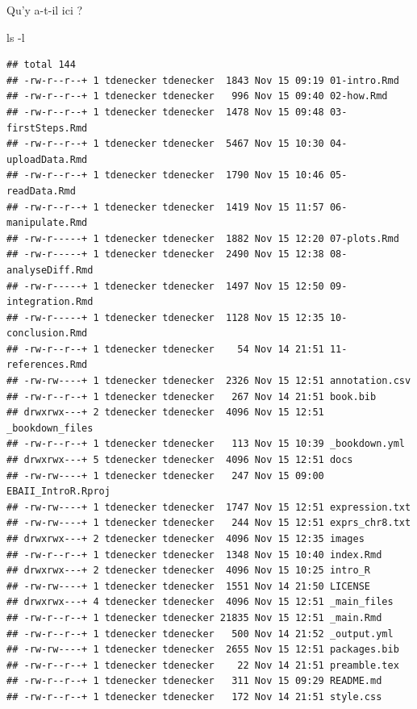 \documentclass[
]{book}
\newenvironment{Shaded}{\begin{snugshade}}{\end{snugshade}}
\newcommand{\AttributeTok}[1]{\textcolor[rgb]{0.77,0.63,0.00}{#1}}
\newcommand{\FunctionTok}[1]{\textcolor[rgb]{0.00,0.00,0.00}{#1}}
\begin{document}
Qu'y a-t-il ici ?

\begin{Shaded}
\begin{Highlighting}[]
\FunctionTok{ls} \AttributeTok{{-}l}
\end{Highlighting}
\end{Shaded}

\begin{verbatim}
## total 144
## -rw-r--r--+ 1 tdenecker tdenecker  1843 Nov 15 09:19 01-intro.Rmd
## -rw-r--r--+ 1 tdenecker tdenecker   996 Nov 15 09:40 02-how.Rmd
## -rw-r--r--+ 1 tdenecker tdenecker  1478 Nov 15 09:48 03-firstSteps.Rmd
## -rw-r--r--+ 1 tdenecker tdenecker  5467 Nov 15 10:30 04-uploadData.Rmd
## -rw-r--r--+ 1 tdenecker tdenecker  1790 Nov 15 10:46 05-readData.Rmd
## -rw-r--r--+ 1 tdenecker tdenecker  1419 Nov 15 11:57 06-manipulate.Rmd
## -rw-r-----+ 1 tdenecker tdenecker  1882 Nov 15 12:20 07-plots.Rmd
## -rw-r-----+ 1 tdenecker tdenecker  2490 Nov 15 12:38 08-analyseDiff.Rmd
## -rw-r-----+ 1 tdenecker tdenecker  1497 Nov 15 12:50 09-integration.Rmd
## -rw-r-----+ 1 tdenecker tdenecker  1128 Nov 15 12:35 10-conclusion.Rmd
## -rw-r--r--+ 1 tdenecker tdenecker    54 Nov 14 21:51 11-references.Rmd
## -rw-rw----+ 1 tdenecker tdenecker  2326 Nov 15 12:51 annotation.csv
## -rw-r--r--+ 1 tdenecker tdenecker   267 Nov 14 21:51 book.bib
## drwxrwx---+ 2 tdenecker tdenecker  4096 Nov 15 12:51 _bookdown_files
## -rw-r--r--+ 1 tdenecker tdenecker   113 Nov 15 10:39 _bookdown.yml
## drwxrwx---+ 5 tdenecker tdenecker  4096 Nov 15 12:51 docs
## -rw-rw----+ 1 tdenecker tdenecker   247 Nov 15 09:00 EBAII_IntroR.Rproj
## -rw-rw----+ 1 tdenecker tdenecker  1747 Nov 15 12:51 expression.txt
## -rw-rw----+ 1 tdenecker tdenecker   244 Nov 15 12:51 exprs_chr8.txt
## drwxrwx---+ 2 tdenecker tdenecker  4096 Nov 15 12:35 images
## -rw-r--r--+ 1 tdenecker tdenecker  1348 Nov 15 10:40 index.Rmd
## drwxrwx---+ 2 tdenecker tdenecker  4096 Nov 15 10:25 intro_R
## -rw-rw----+ 1 tdenecker tdenecker  1551 Nov 14 21:50 LICENSE
## drwxrwx---+ 4 tdenecker tdenecker  4096 Nov 15 12:51 _main_files
## -rw-r--r--+ 1 tdenecker tdenecker 21835 Nov 15 12:51 _main.Rmd
## -rw-r--r--+ 1 tdenecker tdenecker   500 Nov 14 21:52 _output.yml
## -rw-rw----+ 1 tdenecker tdenecker  2655 Nov 15 12:51 packages.bib
## -rw-r--r--+ 1 tdenecker tdenecker    22 Nov 14 21:51 preamble.tex
## -rw-r--r--+ 1 tdenecker tdenecker   311 Nov 15 09:29 README.md
## -rw-r--r--+ 1 tdenecker tdenecker   172 Nov 14 21:51 style.css
\end{verbatim}
\end{document}
